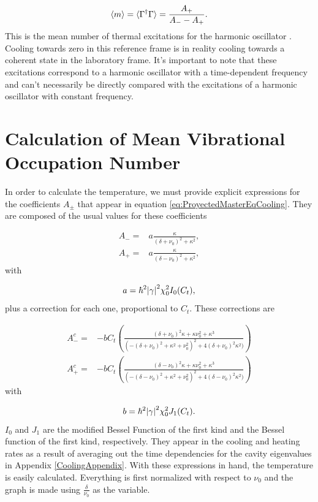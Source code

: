 \documentclass[reprint, amsmath,amssymb, aps,pra]{revtex4-1}
\begin{document}
\begin{equation}
\expval{m} =\langle \Gamma^\dagger \Gamma \rangle = \frac{A_+}{A_- - A_+}.
\end{equation} This is the mean number of thermal excitations for the harmonic oscillator . Cooling towards zero in this reference frame is in reality cooling towards a coherent state in the laboratory frame. It's important to note that these excitations correspond to a harmonic oscillator with a time-dependent frequency and can't necessarily be directly compared with the excitations of a harmonic oscillator with constant frequency.



\section{Calculation of Mean Vibrational Occupation Number}\label{NumCal}

In order to calculate the temperature, we must provide explicit expressions for the coefficients $A_\pm$ that appear in equation \eqref{eq:ProyectedMasterEqCooling}.  They are composed of the usual values for these coefficients\citep{LCNooshi}

\begin{align}
A_- =& a\frac{\kappa}{(\delta+\nu_0)^2+\kappa^2},\\
A_+ =& a\frac{\kappa}{(\delta-\nu_0)^2+\kappa^2},
\end{align} with 

\begin{equation}
a = \hbar^2\abs{\gamma}^2\chi_0^2 I_0(C_t),
\end{equation} plus a correction for each one, proportional to  $C_t$. These corrections are

\begin{align}
A_-^c=& -bC_t(\frac{(\delta+\nu_0)^2\kappa+ \kappa\nu_0^2 + \kappa^3}{(-(\delta+\nu_0)^2+\kappa^2+\nu_0^2)^2+4(\delta+\nu_0)^2\kappa^2)})\\
A_+^c=& -bC_t(\frac{(\delta-\nu_0)^2\kappa+ \kappa\nu_0^2 + \kappa^3}{(-(\delta-\nu_0)^2+\kappa^2+\nu_0^2)^2+4(\delta-\nu_0)^2\kappa^2)})
\end{align} with

\begin{equation}
b= \hbar^2\abs{\gamma}^2\chi_0^2 J_1(C_t).
\end{equation}  $I_0$ and $J_1$ are the modified Bessel Function of the first kind and the Bessel function of the first kind, respectively. They appear in the cooling and heating rates as a result of  averaging out the time dependencies for the cavity eigenvalues in Appendix \ref{CoolingAppendix}. With these expressions in hand, the temperature is easily calculated. Everything is first normalized with respect to $\nu_0$ and the graph is made using $\frac{\delta}{\nu_0}$ as the variable.
\end{document}
